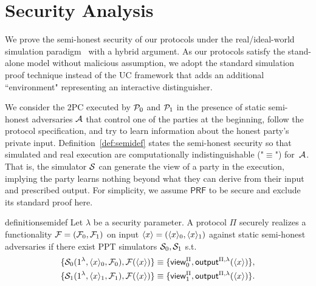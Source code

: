 \section{Security Analysis}
\label{app::fullproof}
We prove the semi-honest security of our protocols under the real/ideal-world simulation paradigm~\cite{sp/17/Lindell17} with a hybrid argument.
As our protocols satisfy the stand-alone model without malicious assumption, we adopt the standard simulation proof technique instead of the UC framework that adds an additional ``environment" representing an interactive distinguisher.

We consider the $2$PC executed by $\mathcal{P}_0$ and $\mathcal{P}_1$ in the presence of static semi-honest adversaries $\mathcal{A}$ that control one of the parties at the beginning, follow the protocol specification, and try to learn information about the honest party's private input.
Definition~\ref{def:semidef} states the semi-honest security so that simulated and real execution are computationally indistinguishable ("$\equiv$") for~$\mathcal{A}$.
That is, the simulator $\mathcal{S}$ can generate the view of a party in the execution, implying the party learns nothing beyond what they can derive from their input and prescribed output.
For simplicity, we assume $\mathsf{PRF}$ to be secure and exclude its standard proof here.

\begin{restatable}{definition}{semidef}
\label{def:semidef} 
	Let $\lambda$ be a security parameter.
	A protocol $\Pi$ securely realizes a functionality $\mathcal{F} = (\mathcal{F}_0, \mathcal{F}_1)$ on input $\langle x \rangle = (\langle x\rangle_0, \langle x\rangle_1)$ against %
	static semi-honest adversaries if there exist PPT simulators $\mathcal{S}_0, \mathcal{S}_1$ s.t.
 \begin{equation*}
     \begin{aligned}
         \{\mathcal{S}_0(1^\lambda, \langle x\rangle_0, \mathcal{F}_0), \mathcal{F}(\langle x \rangle)\} \equiv \{\mathsf{view}_0^\Pi, \mathsf{output}^{\Pi, \lambda}(\langle x \rangle)\},\\
         \{\mathcal{S}_1(1^\lambda,\langle x\rangle_1,\mathcal{F}_1), \mathcal{F}(\langle x \rangle)\} \equiv \{\mathsf{view}_1^\Pi,\mathsf{output}^{\Pi,\lambda}(\langle x \rangle)\}.
     \end{aligned}
 \end{equation*}
\end{restatable}

